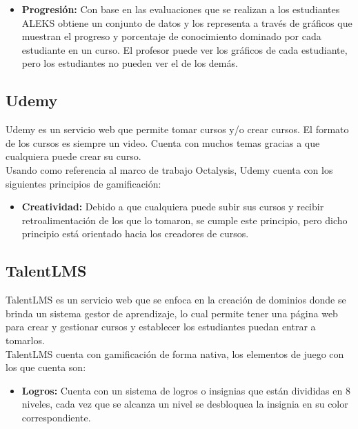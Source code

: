 \begin{multicols*}{2}
\begin{itemize}
        \item {\bf Progresión:} Con base en las evaluaciones que se realizan a los
            estudiantes ALEKS obtiene un conjunto de datos y los representa a través
            de gráficos que muestran el progreso y porcentaje de conocimiento
            dominado por cada estudiante en un curso. El profesor puede ver los
            gráficos de cada estudiante, pero los estudiantes no pueden ver el de
            los demás.
    \end{itemize}


\vfill\null
\columnbreak
\subsection{Udemy}

 Udemy \cite{PagUdemy} es un servicio web que permite tomar cursos y/o crear cursos.
 El formato de los cursos es siempre un video. Cuenta con muchos temas
 gracias a que cualquiera puede crear su curso.\\

    \noindent Usando como referencia al marco de trabajo Octalysis,
    Udemy cuenta con los siguientes principios de gamificación:

    \begin{itemize}
        \item {\bf Creatividad:} Debido a que cualquiera puede subir
        sus cursos y recibir retroalimentación de los que lo tomaron,
        se cumple este principio, pero dicho principio está orientado
        hacia los creadores de cursos.
    \end{itemize}

\subsection{TalentLMS}

 TalentLMS \cite{PagTalentLMS} es un servicio web que se enfoca en la creación de dominios
 donde se brinda un sistema gestor de aprendizaje, lo cual permite tener una página web para
 crear y gestionar cursos y establecer los estudiantes puedan entrar a tomarlos.\\

    \noindent TalentLMS cuenta con gamificación de forma nativa,
    los elementos de juego con los que cuenta son:

    \begin{itemize}

        \item {\bf Logros:} Cuenta con un sistema de logros o insignias que
            están divididas en 8 niveles, cada vez que se alcanza un nivel se
            desbloquea la insignia en su color correspondiente.


\end{itemize}
\end{multicols*}
